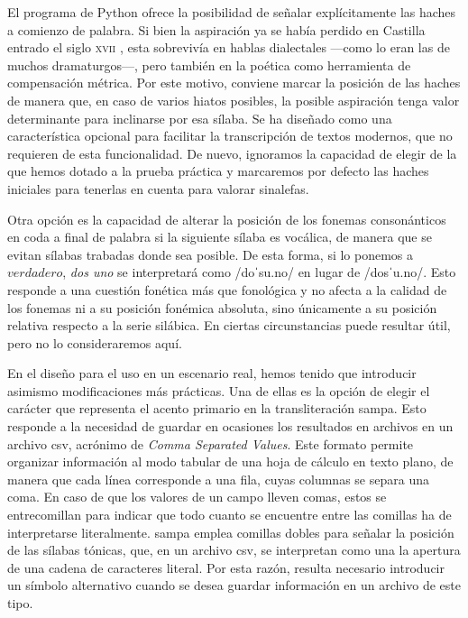 El programa de Python ofrece la posibilidad de señalar explícitamente las haches a comienzo de palabra. Si bien la aspiración ya se había perdido en Castilla entrado el siglo \textsc{xvii} \parencite[91.3]{lapesa2008}, esta sobrevivía en hablas dialectales \parencite{salvador1982} —como lo eran las de muchos dramaturgos—, pero también en la poética como herramienta de compensación métrica. Por este motivo, conviene marcar la posición de las haches de manera que, en caso de varios hiatos posibles, la posible aspiración tenga valor determinante para inclinarse por esa sílaba. Se ha diseñado como una característica opcional para facilitar la transcripción de textos modernos, que no requieren de esta funcionalidad. De nuevo, ignoramos la capacidad de elegir de la que hemos dotado a la prueba práctica y marcaremos por defecto las haches iniciales para tenerlas en cuenta para valorar sinalefas. 

Otra opción es la capacidad de alterar la posición de los fonemas consonánticos en coda a final de palabra si la siguiente sílaba es vocálica, de manera que se evitan sílabas trabadas donde sea posible. De esta forma, si lo ponemos a $verdadero$, \textit{dos uno} se interpretará como /doˈsu.no/ en lugar de /dosˈu.no/. Esto responde a una cuestión fonética más que fonológica y no afecta a la calidad de los fonemas ni a su posición fonémica absoluta, sino únicamente a su posición relativa respecto a la serie silábica. En ciertas circunstancias puede resultar útil, pero no lo consideraremos aquí.

En el diseño para el uso en un escenario real, hemos tenido que introducir asimismo modificaciones más prácticas. Una de ellas es la opción de elegir el carácter que representa el acento primario en la transliteración \ac{sampa}. Esto responde a la necesidad de guardar en ocasiones los resultados en archivos en un archivo \ac{csv}, acrónimo de \textit{Comma Separated Values}. Este formato permite organizar información al modo tabular de una hoja de cálculo en texto plano, de manera que cada línea corresponde a una fila, cuyas columnas se separa una coma. En caso de que los valores de un campo lleven comas, estos se entrecomillan para indicar que todo cuanto se encuentre entre las comillas ha de interpretarse literalmente. \ac{sampa} emplea comillas dobles para señalar la posición de las sílabas tónicas, que, en un archivo \ac{csv}, se interpretan como una la apertura de una cadena de caracteres literal. Por esta razón, resulta necesario introducir un símbolo alternativo cuando se desea guardar información en un archivo de este tipo.

